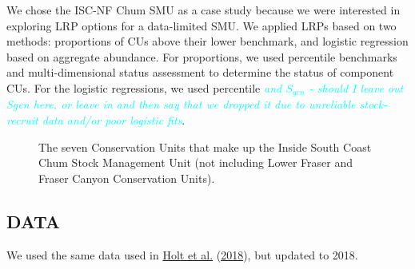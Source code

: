 \documentclass[11pt]{book}
\begin{document}
We chose the ISC-NF Chum SMU as a case study because we were interested in exploring LRP options for a data-limited SMU. We applied LRPs based on two methods: proportions of CUs above their lower benchmark, and logistic regression based on aggregate abundance. For proportions, we used percentile benchmarks and multi-dimensional status assessment to determine the status of component CUs. For the logistic regressions, we used percentile \emph{\textcolor{cyan}{and $S_{gen}$ - should I leave out Sgen here, or leave in and then say that we dropped it due to unreliable stock-recruit data and/or poor logistic fits}}.
\begin{figure}[htb]

{\centering {} 

}

\caption{The seven Conservation Units that make up the Inside South Coast Chum Stock Management Unit (not including Lower Fraser and Fraser Canyon Conservation Units).}\label{fig:chum-map}
\end{figure}
\hypertarget{data-1}{%
\subsection{DATA}\label{data-1}}

We used the same data used in \protect\hyperlink{ref-holtEvaluatingBenchmarksBiological2018}{Holt et al.} (\protect\hyperlink{ref-holtEvaluatingBenchmarksBiological2018}{2018}), but updated to 2018.
\end{document}
